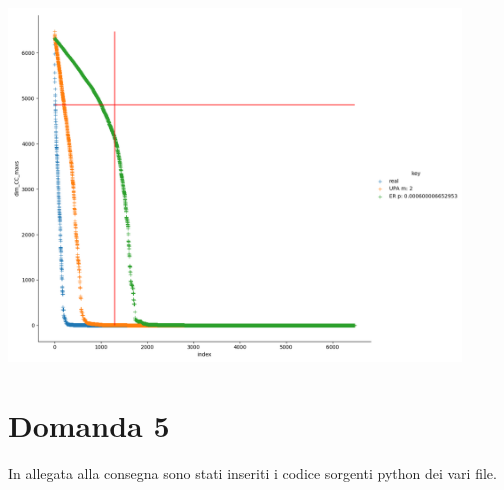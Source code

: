 \documentclass{article}
\begin{document}
\includegraphics[width=0.9\textwidth]{../grafici/Figure_1}

\section*{Domanda 5}
In allegata alla consegna sono stati inseriti i codice sorgenti python dei vari file.
    
\end{document}

